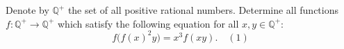 Denote by $\mathbb{Q}^+$ the set of all positive rational numbers. Determine all functions $f : \mathbb{Q}^+ \to \mathbb{Q}^+$ which satisfy the following equation for all $x, y \in \mathbb{Q}^+$:
\[ f\big(f(x)^2 y\big) = x^3 f(xy). \quad (1) \]
